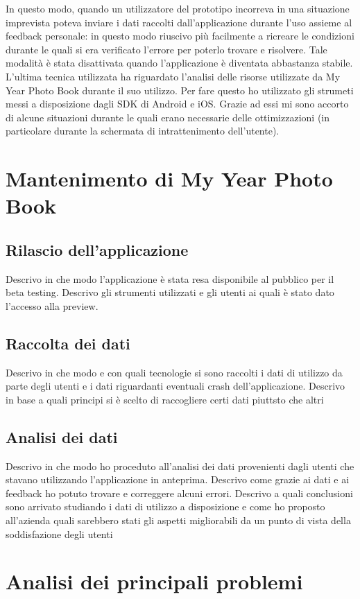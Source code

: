 			In questo modo, quando un utilizzatore del prototipo incorreva in una situazione imprevista poteva inviare i dati raccolti
			dall'applicazione durante l'uso assieme al feedback personale: in questo modo riuscivo più facilmente a ricreare le
			condizioni durante le quali si era verificato l'errore per poterlo trovare e risolvere.	Tale modalità è stata disattivata
			quando l'applicazione è diventata abbastanza stabile.
			L'ultima tecnica utilizzata ha riguardato l'analisi delle risorse utilizzate da My Year Photo Book durante il suo utilizzo.
			Per fare questo ho utilizzato gli strumeti messi a disposizione dagli SDK di Android e iOS. Grazie ad essi mi sono accorto di
			alcune situazioni durante le quali erano necessarie delle ottimizzazioni (in particolare durante la schermata di
			intrattenimento dell'utente).
	\section{Mantenimento di My Year Photo Book}
		\subsection{Rilascio dell'applicazione}
			Descrivo in che modo l'applicazione è stata resa disponibile al pubblico per il beta testing. Descrivo gli strumenti
			utilizzati e gli utenti ai quali è stato dato l'accesso alla preview.
		\subsection{Raccolta dei dati}
			Descrivo in che modo e con quali tecnologie si sono raccolti i dati di utilizzo da parte degli utenti e i dati riguardanti
			eventuali crash dell'applicazione. Descrivo in base a quali principi si è scelto di raccogliere certi dati piuttsto che altri
		\subsection{Analisi dei dati}
			Descrivo in che modo ho proceduto all'analisi dei dati provenienti dagli utenti che stavano utilizzando l'applicazione in
			anteprima. Descrivo come grazie ai dati e ai feedback ho potuto trovare e correggere alcuni errori. Descrivo a quali
			conclusioni sono arrivato studiando i dati di utilizzo a disposizione e come ho proposto all'azienda quali sarebbero stati
			gli aspetti migliorabili da un punto di vista della soddisfazione degli utenti
	\section{Analisi dei principali problemi}
